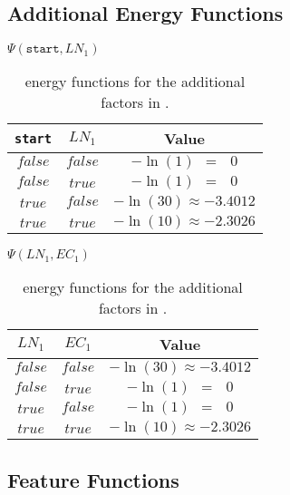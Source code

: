 \subsection{Additional Energy Functions}\label{app:subsec-lccrf-additional-energy-functions}
\begin{table}[H]
\begin{minipage}{0.5\linewidth}
\centering
$\Psi(\texttt{start},LN_1)$\par
\smallskip
\begin{tabular}{c c c}
 \toprule
 \texttt{start} & $LN_1$ & Value \\
 \midrule
 $\mathit{false}$ & $\mathit{false}$ & $-\ln(1)\ \ =\ \ \ 0$ \\
 $\mathit{false}$ & $\mathit{true}$ & $-\ln(1)\ \ =\ \ \ 0$ \\
 $\mathit{true}$ & $\mathit{false}$ & $-\ln(30)\approx-3.4012$ \\
 $\mathit{true}$ & $\mathit{true}$ & $-\ln(10)\approx-2.3026$ \\
 \bottomrule
\end{tabular}
\end{minipage}
\hfill
\begin{minipage}{0.5\linewidth}
\centering
$\Psi(LN_1,EC_1)$\par
\smallskip
\begin{tabular}{c c c}
 \toprule
 $LN_1$ & $EC_1$ & Value \\
 \midrule
 $\mathit{false}$ & $\mathit{false}$ & $-\ln(30)\approx-3.4012$ \\
 $\mathit{false}$ & $\mathit{true}$ & $-\ln(1)\ \ =\ \ \ 0$ \\
 $\mathit{true}$ & $\mathit{false}$ & $-\ln(1)\ \ =\ \ \ 0$ \\
 $\mathit{true}$ & $\mathit{true}$ & $-\ln(10)\approx-2.3026$ \\
 \bottomrule
\end{tabular}
\end{minipage}
\caption{\Glspl{energy function} for the additional \glspl{factor} in .}
\label{tab:example-linear-chain-crf-energy-functions}
\end{table}

\subsection{Feature Functions}\label{app:subsec-lccrf-feature-functions}

